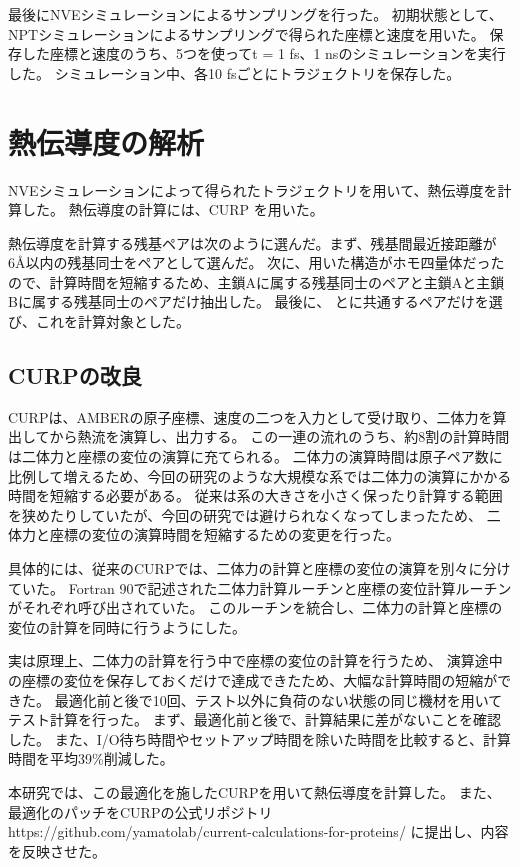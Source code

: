 最後にNVEシミュレーションによるサンプリングを行った。
初期状態として、NP\gamma Tシミュレーションによるサンプリングで得られた座標と速度を用いた。
保存した座標と速度のうち、5つを使って\Delta t = 1 fs、1 nsのシミュレーションを実行した。
シミュレーション中、各10 fsごとにトラジェクトリを保存した。

\section{熱伝導度の解析}

NVEシミュレーションによって得られたトラジェクトリを用いて、熱伝導度を計算した。
熱伝導度の計算には、CURP\autocite{ishikura_energy_2015,ota_energy_2019,yamatoComputationalStudyThermal2022,wangSiteselectiveHeatCurrent2023} を用いた。

熱伝導度を計算する残基ペアは次のように選んだ。まず、残基間最近接距離が6\AA 以内の残基同士をペアとして選んだ。
次に、用いた構造がホモ四量体だったので、計算時間を短縮するため、主鎖Aに属する残基同士のペアと主鎖Aと主鎖Bに属する残基同士のペアだけ抽出した。
最後に、 \openFortyTwo と\closeFortyTwo に共通するペアだけを選び、これを計算対象とした。

\subsection{CURPの改良}\label{sec:curp}

CURPは、AMBERの原子座標、速度の二つを入力として受け取り、二体力を算出してから熱流を演算し、出力する。
この一連の流れのうち、約8割の計算時間は二体力と座標の変位の演算に充てられる。
二体力の演算時間は原子ペア数に比例して増えるため、今回の研究のような大規模な系では二体力の演算にかかる時間を短縮する必要がある。
従来は系の大きさを小さく保ったり計算する範囲を狭めたりしていたが、今回の研究では避けられなくなってしまったため、
二体力と座標の変位の演算時間を短縮するための変更を行った。

具体的には、従来のCURPでは、二体力の計算と座標の変位の演算を別々に分けていた。
Fortran 90で記述された二体力計算ルーチンと座標の変位計算ルーチンがそれぞれ呼び出されていた。
このルーチンを統合し、二体力の計算と座標の変位の計算を同時に行うようにした。

実は原理上、二体力の計算を行う中で座標の変位の計算を行うため、
演算途中の座標の変位を保存しておくだけで達成できたため、大幅な計算時間の短縮ができた。
最適化前と後で10回、テスト以外に負荷のない状態の同じ機材を用いてテスト計算を行った。
まず、最適化前と後で、計算結果に差がないことを確認した。
また、I/O待ち時間やセットアップ時間を除いた時間を比較すると、計算時間を平均39\%削減した。

本研究では、この最適化を施したCURPを用いて熱伝導度を計算した。
また、最適化のパッチをCURPの公式リポジトリ https://github.com/yamatolab/current-calculations-for-proteins/ に提出し、内容を反映させた。
